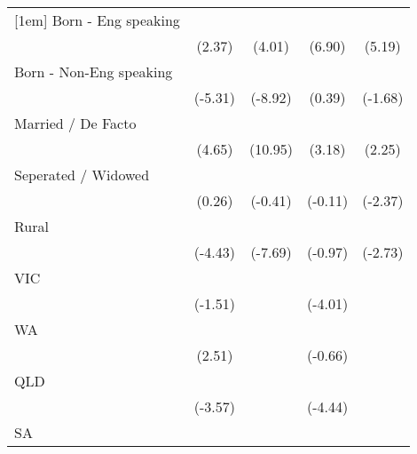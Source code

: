 {\begin{tabular}{l*{4}{c}}
[1em]
Born - Eng speaking &            \sym{*}  &            \sym{***}&            \sym{***}&            \sym{***}\\
                    &      (2.37)         &      (4.01)         &      (6.90)         &      (5.19)         \\
[1em]
Born - Non-Eng speaking&            \sym{***}&            \sym{***}&                     &                     \\
                    &     (-5.31)         &     (-8.92)         &      (0.39)         &     (-1.68)         \\
[1em]
Married / De Facto  &            \sym{***}&            \sym{***}&            \sym{**} &            \sym{*}  \\
                    &      (4.65)         &     (10.95)         &      (3.18)         &      (2.25)         \\
[1em]
Seperated / Widowed &                     &                     &                     &            \sym{*}  \\
                    &      (0.26)         &     (-0.41)         &     (-0.11)         &     (-2.37)         \\
[1em]
Rural               &            \sym{***}&            \sym{***}&                     &            \sym{**} \\
                    &     (-4.43)         &     (-7.69)         &     (-0.97)         &     (-2.73)         \\
[1em]
VIC                 &                     &                     &            \sym{***}&                     \\
                    &     (-1.51)         &                     &     (-4.01)         &                     \\
[1em]
WA                  &            \sym{*}  &                     &                     &                     \\
                    &      (2.51)         &                     &     (-0.66)         &                     \\
[1em]
QLD                 &            \sym{***}&                     &            \sym{***}&                     \\
                    &     (-3.57)         &                     &     (-4.44)         &                     \\
[1em]
SA                  &            \sym{***}&                     &                     &                     \\

\end{tabular}}
